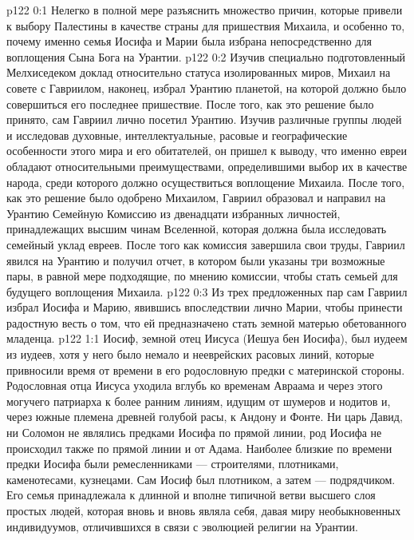 \vs p122 0:1 Нелегко в полной мере разъяснить множество причин, которые привели к выбору Палестины в качестве страны для пришествия Михаила, и особенно то, почему именно семья Иосифа и Марии была избрана непосредственно для воплощения Сына Бога на Урантии.
\vs p122 0:2 Изучив специально подготовленный Мелхиседеком доклад относительно статуса изолированных миров, Михаил на совете с Гавриилом, наконец, избрал Урантию планетой, на которой должно было совершиться его последнее пришествие. После того, как это решение было принято, сам Гавриил лично посетил Урантию. Изучив различные группы людей и исследовав духовные, интеллектуальные, расовые и географические особенности этого мира и его обитателей, он пришел к выводу, что именно евреи обладают относительными преимуществами, определившими выбор их в качестве народа, среди которого должно осуществиться воплощение Михаила. После того, как это решение было одобрено Михаилом, Гавриил образовал и направил на Урантию Семейную Комиссию из двенадцати избранных личностей, принадлежащих высшим чинам Вселенной, которая должна была исследовать семейный уклад евреев. После того как комиссия завершила свои труды, Гавриил явился на Урантию и получил отчет, в котором были указаны три возможные пары, в равной мере подходящие, по мнению комиссии, чтобы стать семьей для будущего воплощения Михаила.
\vs p122 0:3 Из трех предложенных пар сам Гавриил избрал Иосифа и Марию, явившись впоследствии лично Марии, чтобы принести радостную весть о том, что ей предназначено стать земной матерью обетованного младенца.
\vs p122 1:1 Иосиф, земной отец Иисуса (Иешуа бен Иосифа), был иудеем из иудеев, хотя у него было немало и нееврейских расовых линий, которые привносили время от времени в его родословную предки с материнской стороны. Родословная отца Иисуса уходила вглубь ко временам Авраама и через этого могучего патриарха к более ранним линиям, идущим от шумеров и нодитов и, через южные племена древней голубой расы, к Андону и Фонте. Ни царь Давид, ни Соломон не являлись предками Иосифа по прямой линии, род Иосифа не происходил также по прямой линии и от Адама. Наиболее близкие по времени предки Иосифа были ремесленниками --- строителями, плотниками, каменотесами, кузнецами. Сам Иосиф был плотником, а затем --- подрядчиком. Его семья принадлежала к длинной и вполне типичной ветви высшего слоя простых людей, которая вновь и вновь являла себя, давая миру необыкновенных индивидуумов, отличившихся в связи с эволюцией религии на Урантии.
